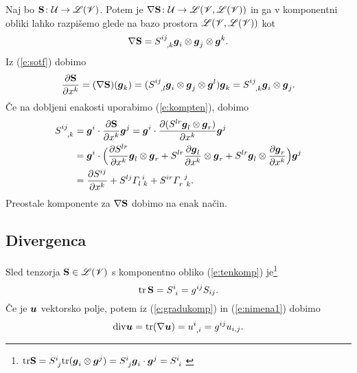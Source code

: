 Naj bo $\mathbf S\colon \mathcal U\to\mathscr L(\mathscr V)$. Potem je $\nabla\mathbf S\colon \mathcal U\to\mathscr L(\mathscr V,\mathscr L(\mathscr V))$
in ga v komponentni obliki lahko razpišemo glede na bazo prostora $\mathscr L(\mathscr V,\mathscr L(\mathscr V))$ kot
\[ \nabla\ten{S}=\topbot{S}{ij}{,k}\vek{g}_i\otimes\vek{g}_j\otimes\vek{g}^k. \]
Iz (\ref{e:sotf}) dobimo
\[
	\frac{\partial\ten{S}}{\partial x^k}=(\nabla\ten{S})(\vek{g}_k)=
	(\topbot{S}{ij}{,l}\vek{g}_i\otimes\vek{g}_j\otimes\vek{g}^l)\vek{g}_k=
	\topbot{S}{ij}{,k}\vek{g}_i\otimes\vek{g}_j.
\]
Če na dobljeni enakosti uporabimo (\ref{e:kompten}), dobimo
\begin{align*}
	\topbot{S}{ij}{,k}&=\vek{g}^i\cdot\frac{\partial\ten{S}}{\partial x^k}\vek{g}^j=
	\vek{g}^i\cdot\frac{\partial(S^{lr}\vek{g}_l\otimes\vek{g}_r)}{\partial x^k}\vek{g}^j \\
	&=\vek{g}^i\cdot\Big(
	\frac{\partial S^{lr}}{\partial x^k}\vek{g}_l\otimes\vek{g}_r+
	S^{lr}\frac{\partial\vek{g}_l}{\partial x^k}\otimes\vek{g}_r+
	S^{lr}\vek{g}_l\otimes\frac{\partial\vek{g}_r}{\partial x^k}
	\Big)\vek{g}^j \\
	&=\frac{\partial S^{ij}}{\partial x^k}+S^{lj}\cs{l}{i}{k}+S^{ir}\cs{r}{j}{k}.
\end{align*}
Preostale komponente za $\nabla\mathbf S$ dobimo na enak način.


\subsection{Divergenca}


Sled tenzorja $\mathbf S\in\mathscr L(\mathscr V)$ s komponentno obliko (\ref{e:tenkomp})
je\footnote{$\tr\ten{S}=\topbot{S}{i}{j}\tr(\vek{g}_i\otimes\vek{g}^j)=
\topbot{S}{i}{j}\vek{g}_i\cdot\vek{g}^j=\topbot{S}{i}{i}$ \cite[str.~249]{liu}}
\[ \tr\,\ten{S}=\topbot{S}{i}{i}=g^{ij}S_{ij}. \]
Če je $\boldsymbol u$ vektorsko polje, potem iz (\ref{e:gradukomp}) in (\ref{e:nimena1}) dobimo
\begin{equation} \label{e:divu}
	\div\vek{u} = \tr(\nabla\vek{u}) = \topbot{u}{i}{,i} = g^{ij}u_{i,j}.
\end{equation}

